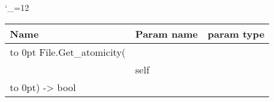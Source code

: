 \begingroup \catcode`\_=12 \tt
\begin{tabular}{lll}
\toprule
\textrm{Name}&\textrm{Param name}&\textrm{param type}\\
\midrule
\hbox to 0pt {File.Get_atomicity(\hss}\\
& self\\
\hbox to 0pt{) -> bool\hss}\\
\bottomrule
\end{tabular}
\endgroup
